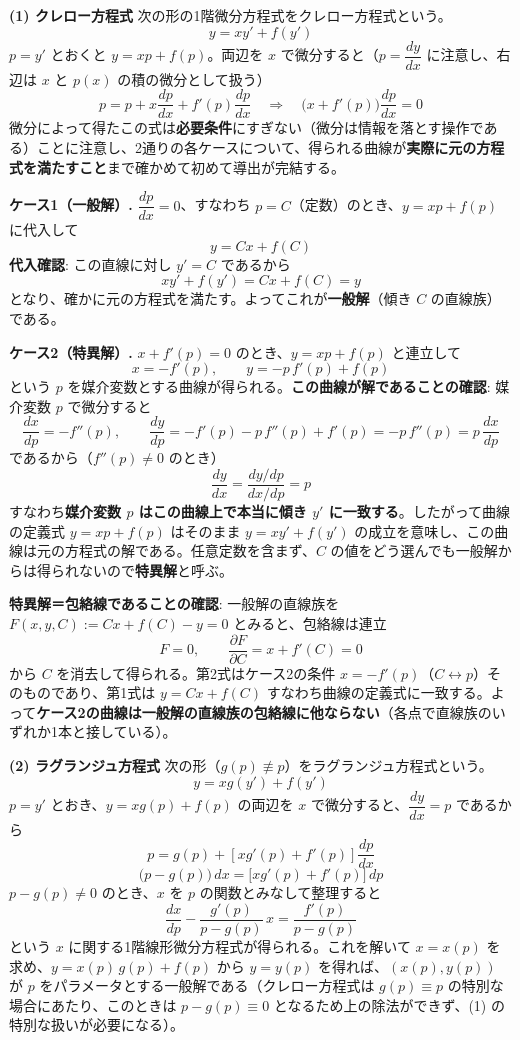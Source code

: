 \documentclass[a4paper,11pt]{article}
\begin{document}


\noindent
\textbf{(1) クレロー方程式}\quad
次の形の1階微分方程式をクレロー方程式という。
\[
y = xy' + f(y')
\]
$p = y'$ とおくと $y = xp + f(p)$。両辺を $x$ で微分すると（$p = \dfrac{dy}{dx}$ に注意し、右辺は $x$ と $p(x)$ の積の微分として扱う）
\[
p = p + x\frac{dp}{dx} + f'(p)\frac{dp}{dx}
\quad\Longrightarrow\quad
\bigl(x + f'(p)\bigr)\frac{dp}{dx} = 0
\]
微分によって得たこの式は\textbf{必要条件}にすぎない（微分は情報を落とす操作である）ことに注意し、2通りの各ケースについて、得られる曲線が\textbf{実際に元の方程式を満たすこと}まで確かめて初めて導出が完結する。

\medskip
\noindent
\textbf{ケース1（一般解）.}\quad
$\dfrac{dp}{dx} = 0$、すなわち $p = C$（定数）のとき、$y = xp+f(p)$ に代入して
\[
y = Cx + f(C)
\]
\textbf{代入確認}: この直線に対し $y' = C$ であるから
\[
xy' + f(y') = Cx + f(C) = y
\]
となり、確かに元の方程式を満たす。よってこれが\textbf{一般解}（傾き $C$ の直線族）である。

\medskip
\noindent
\textbf{ケース2（特異解）.}\quad
$x + f'(p) = 0$ のとき、$y = xp + f(p)$ と連立して
\[
x = -f'(p), \qquad y = -p\,f'(p) + f(p)
\]
という $p$ を媒介変数とする曲線が得られる。\textbf{この曲線が解であることの確認}: 媒介変数 $p$ で微分すると
\[
\frac{dx}{dp} = -f''(p), \qquad
\frac{dy}{dp} = -f'(p) - p\,f''(p) + f'(p) = -p\,f''(p) = p\,\frac{dx}{dp}
\]
であるから（$f''(p)\neq0$ のとき）
\[
\frac{dy}{dx} = \frac{dy/dp}{dx/dp} = p
\]
すなわち\textbf{媒介変数 $p$ はこの曲線上で本当に傾き $y'$ に一致する}。したがって曲線の定義式 $y = xp + f(p)$ はそのまま $y = xy' + f(y')$ の成立を意味し、この曲線は元の方程式の解である。任意定数を含まず、$C$ の値をどう選んでも一般解からは得られないので\textbf{特異解}と呼ぶ。

\medskip
\noindent
\textbf{特異解＝包絡線であることの確認}: 一般解の直線族を $F(x,y,C) := Cx + f(C) - y = 0$ とみると、包絡線は連立
\[
F = 0, \qquad \frac{\partial F}{\partial C} = x + f'(C) = 0
\]
から $C$ を消去して得られる。第2式はケース2の条件 $x = -f'(p)$（$C \leftrightarrow p$）そのものであり、第1式は $y = Cx + f(C)$ すなわち曲線の定義式に一致する。よって\textbf{ケース2の曲線は一般解の直線族の包絡線に他ならない}（各点で直線族のいずれか1本と接している）。

\noindent
\textbf{(2) ラグランジュ方程式}\quad
次の形（$g(p) \not\equiv p$）をラグランジュ方程式という。
\[
y = xg(y') + f(y')
\]
$p = y'$ とおき、$y = xg(p) + f(p)$ の両辺を $x$ で微分すると、$\dfrac{dy}{dx} = p$ であるから
\[
p = g(p) + \left[x g'(p) + f'(p)\right]\frac{dp}{dx}
\]
\[
\bigl(p - g(p)\bigr)\,dx = \bigl[x g'(p) + f'(p)\bigr]\,dp
\]
$p - g(p) \neq 0$ のとき、$x$ を $p$ の関数とみなして整理すると
\[
\frac{dx}{dp} - \frac{g'(p)}{p - g(p)}\,x = \frac{f'(p)}{p - g(p)}
\]
という $x$ に関する1階線形微分方程式が得られる。これを解いて $x = x(p)$ を求め、$y = x(p)\,g(p) + f(p)$ から $y = y(p)$ を得れば、$(x(p), y(p))$ が $p$ をパラメータとする一般解である（クレロー方程式は $g(p) \equiv p$ の特別な場合にあたり、このときは $p - g(p) \equiv 0$ となるため上の除法ができず、(1) の特別な扱いが必要になる）。
\end{document}
